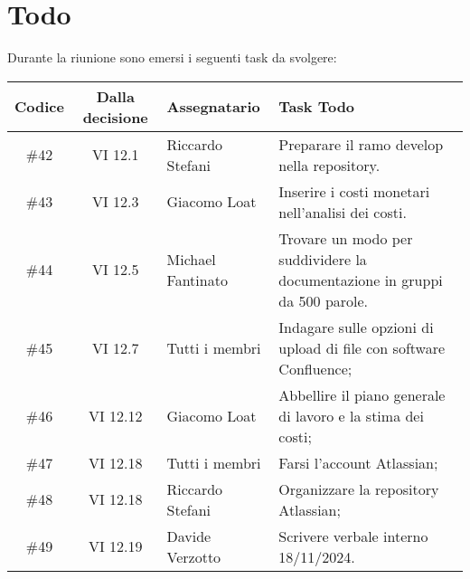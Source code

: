 
\section{Todo}

Durante la riunione sono emersi i seguenti task da svolgere:

\vspace{0.5cm}

\begin{table}[htbp]
\centering
{}
\begin{tabular}{|c|c|p{}|p{}|}
    \hline
    \rowcolor[gray]{0.75}
    \textbf{Codice} & \textbf{Dalla decisione} & \textbf{Assegnatario} & \textbf{Task Todo} \\
    \hline
    \#42 & VI 12.1 & Riccardo Stefani & Preparare il ramo develop nella repository. \\
    \hline
    \#43 & VI 12.3 & Giacomo Loat & Inserire i costi monetari nell'analisi dei costi. \\
    \hline
    \#44 & VI 12.5 & Michael Fantinato & Trovare un modo per suddividere la documentazione in gruppi da 500 parole. \\
    \hline
    \#45 & VI 12.7 & Tutti i membri & Indagare sulle opzioni di upload di file con software Confluence; \\
    \hline
    \#46 & VI 12.12 & Giacomo Loat & Abbellire il piano generale di lavoro e la stima dei costi; \\
    \hline
    \#47 & VI 12.18 & Tutti i membri & Farsi l'account Atlassian; \\
    \hline
    \#48 & VI 12.18 & Riccardo Stefani & Organizzare la repository Atlassian; \\
    \hline
    \#49 & VI 12.19 & Davide Verzotto & Scrivere verbale interno 18/11/2024. \\
   \hline
\end{tabular}
\end{table}